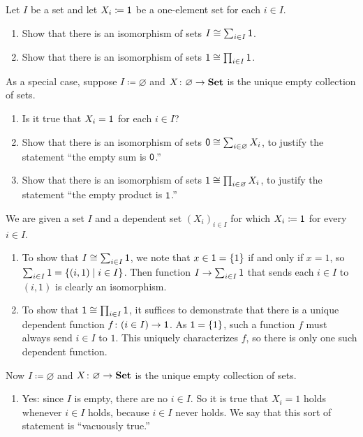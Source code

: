 \documentclass[Book-Poly]{subfiles}
\begin{document}
\begin{exercise}\label{exc.on_sums_prods_sets}
Let $I$ be a set and let $X_i\coloneqq\textsf{1}$ be a one-element set for each $i\in I$. 
\begin{enumerate}
	\item \label{exc.on_sums_prods_sets.sum} Show that there is an isomorphism of sets $I\cong\sum_{i\in I}\textsf{1}$.
	\item \label{exc.on_sums_prods_sets.prod} Show that there is an isomorphism of sets $\textsf{1}\cong\prod_{i\in I}\textsf{1}$.
\end{enumerate}
As a special case, suppose $I\coloneqq\varnothing$ and $X\colon \varnothing\to\mathbf{Set}$ is the unique empty collection of sets.
\begin{enumerate}[resume]
	\item Is it true that $X_i=\textsf{1}$ for each $i\in I$?
	\item Show that there is an isomorphism of sets $\textsf{0}\cong\sum_{i\in\varnothing}X_i$, to justify the statement ``the empty sum is $\textsf{0}$.''
	\item Show that there is an isomorphism of sets $\textsf{1}\cong\prod_{i\in\varnothing}X_i$, to justify the statement ``the empty product is $\textsf{1}$.''
\qedhere
\end{enumerate}

\begin{solution}
We are given a set $I$ and a dependent set $(X_i)_{i \in I}$ for which $X_i \coloneqq \textsf{1}$ for every $i \in I$.
\begin{enumerate}
    \item \label{sol.on_sums_prods_sets.sum}
    To show that $I \cong \sum_{i \in I} \textsf{1}$, we note that $x \in \textsf{1} = \{1\}$ if and only if $x = 1$, so $\sum_{i \in I} \textsf{1} = \{(i, 1) \mid i \in I\}$.
    Then function $I \to \sum_{i \in I} \textsf{1}$ that sends each $i \in I$ to $(i, 1)$ is clearly an isomorphism.
    
    \item \label{sol.on_sums_prods_sets.prod}
    To show that $\textsf{1} \cong \prod_{i \in I} \textsf{1}$, it suffices to demonstrate that there is a unique dependent function $f \colon (i \in I) \to \textsf{1}$.
    As $\textsf{1} = \{1\}$, such a function $f$ must always send $i \in I$ to $1$.
    This uniquely characterizes $f$, so there is only one such dependent function.
    
\end{enumerate}
Now $I \coloneqq \varnothing$ and $X \colon \varnothing \to \mathbf{Set}$ is the unique empty collection of sets.
\begin{enumerate}[resume]
    \item \label{sol.on_sums_prods_sets.vac} Yes: since $I$ is empty, there are no $i \in I$.
    So it is true that $X_i = 1$ holds whenever $i \in I$ holds, because $i \in I$ never holds. 
    We say that this sort of statement is ``vacuously true.''
    

\end{enumerate}
\end{solution}
\end{exercise}
\end{document}
